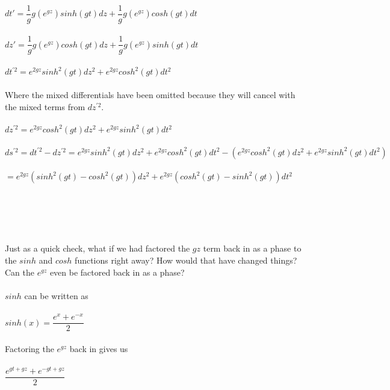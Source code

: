 \documentclass[prb,preprint]
{revtex4-1}
\begin{document}
\\
$dt' = \dfrac{1}{g}g\left(e^{gz}\right)sinh\left(gt\right)dz + \dfrac{1}{g}g\left(e^{gz}\right)cosh\left(gt\right)dt$
\\
\\
$dz' = \dfrac{1}{g}g\left(e^{gz}\right)cosh\left(gt\right)dz + \dfrac{1}{g}g\left(e^{gz}\right)sinh\left(gt\right)dt$
\\
\\
$dt^{\prime 2} = e^{2gz}sinh^2\left(gt\right)dz^2 + e^{2gz}cosh^2\left(gt\right)dt^2$
\\
\\
Where the mixed differentials have been omitted because they will cancel with the mixed terms from $dz^{\prime 2}$.
\\
\\
$dz^{\prime 2} = e^{2gz}cosh^2\left(gt\right)dz^2 + e^{2gz}sinh^2\left(gt\right)dt^2$
\\
\\
$ds^{\prime 2} = dt^{\prime 2} - dz^{\prime 2} = e^{2gz}sinh^2\left(gt\right)dz^2 + e^{2gz}cosh^2\left(gt\right)dt^2 - \left(e^{2gz}cosh^2\left(gt\right)dz^2 + e^{2gz}sinh^2\left(gt\right)dt^2\right)$
\\
\\
$= e^{2gz}\left(sinh^2\left(gt\right) - cosh^2\left(gt\right)\right)dz^2 + e^{2gz}\left(cosh^2\left(gt\right) - sinh^2\left(gt\right)\right)dt^2$
\\
\\
\\
\\
\\
\\
Just as a quick check, what if we had factored the $gz$ term back in as a phase to the $sinh$ and $cosh$ functions right away?  How would that have changed things?  Can the $e^{gz}$ even be factored back in as a phase?
\\
\\
$sinh$ can be written as 
\\
\\
$sinh\left(x\right) = \dfrac{e^x +e^{-x}}{2}$
\\
\\
Factoring the $e^{gz}$ back in gives us
\\
\\
$\dfrac{e^{gt + gz} +e^{-gt + gz}}{2}$
\\
\\
\end{document}
